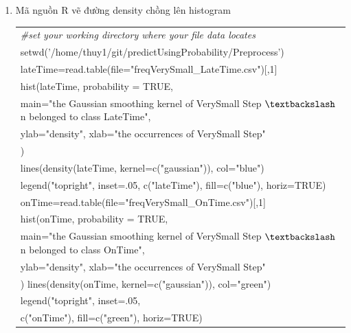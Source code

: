 \documentclass[a4paper, 13pt]{report}
\begin{document}
\begin{enumerate}[label=\textbf{PL\arabic*}]
\item Mã nguồn R vẽ đường density chồng lên histogram
\begin{flushleft}
\begin{tabular}{  |l| }
\hline 
\textit{\#set your working directory where your file data locates}\\
setwd('/home/thuy1/git/predictUsingProbability/Preprocess')\\
lateTime=read.table(file="freqVerySmall\_LateTime.csv")[,1]\\
hist(lateTime, probability = TRUE,\\
     main="the Gaussian smoothing kernel of VerySmall Step $\textbackslash$n belonged to class LateTime",\\
     ylab="density", xlab="the occurrences of VerySmall Step"\\
     )\\
lines(density(lateTime, kernel=c("gaussian")), col="blue")\\
legend("topright", inset=.05, c("lateTime"), fill=c("blue"), horiz=TRUE)\\
onTime=read.table(file="freqVerySmall\_OnTime.csv")[,1]\\
hist(onTime, probability = TRUE,\\
     main="the Gaussian smoothing kernel of VerySmall Step $\textbackslash$n belonged to class OnTime",\\
     ylab="density", xlab="the occurrences of VerySmall Step"\\
     )
lines(density(onTime, kernel=c("gaussian")), col="green")\\
legend("topright", inset=.05, \\
       c("onTime"), fill=c("green"), horiz=TRUE)\\
\hline
\end{tabular}
\end{flushleft}


\end{enumerate}
\end{document}
